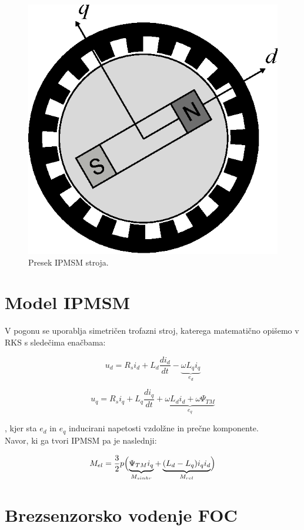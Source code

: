 \documentclass[a4paper,twoside,openright,12pt,slovene]{book}
\begin{document}
\begin{figure}[!htbp]
    \centering
    \includegraphics[width=0.5\columnwidth]{Slike/Inkscape/IPMSMsimple.eps}
    \caption{\label{IPMSM} Presek IPMSM stroja.}
\end{figure}


\section{Model IPMSM} \label{motor}

V pogonu se uporablja simetričen trofazni stroj, katerega matematično opišemo v RKS s sledečima enačbama:

\begin{equation} \label{motorModelD}
    u_d = R_si_d+L_d\frac{di_d}{dt}-\underbrace{\omega L_qi_q}_{e_d}
\end{equation}

\begin{equation} \label{motorModelQ}
    u_q = R_si_q+L_q\frac{di_q}{dt}+\underbrace{\omega L_di_d + \omega\Psi_{TM}}_{e_q}
\end{equation}

, kjer sta $e_d$ in $e_q$ inducirani napetosti vzdolžne in prečne komponente. \\
Navor, ki ga tvori IPMSM pa je naslednji:

\begin{equation}
    M_{el} = \frac{3}{2}p\Bigl(\underbrace{\Psi_{TM}i_q}_{M_{sinhr}}+\underbrace{(L_d-L_q)i_qi_d}_{M_{rel}}\Bigr)
\end{equation}


\section{Brezsenzorsko vodenje FOC}
\end{document}

